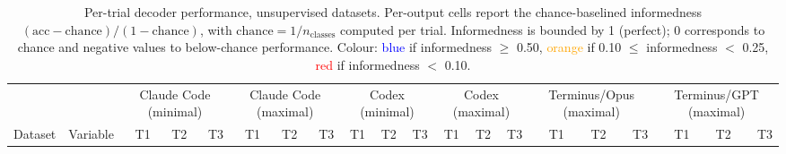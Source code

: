 \begin{table}[t]
\centering
\setlength{\tabcolsep}{4pt}
\begin{tabular}{l l rrr rrr rrr rrr rrr rrr}
\toprule
 & & \multicolumn{3}{c}{Claude Code (minimal)} & \multicolumn{3}{c}{Claude Code (maximal)} & \multicolumn{3}{c}{Codex (minimal)} & \multicolumn{3}{c}{Codex (maximal)} & \multicolumn{3}{c}{Terminus/Opus (maximal)} & \multicolumn{3}{c}{Terminus/GPT (maximal)} \\
\cmidrule(lr){3-5} \cmidrule(lr){6-8} \cmidrule(lr){9-11} \cmidrule(lr){12-14} \cmidrule(lr){15-17} \cmidrule(lr){18-20}
Dataset & Variable & T1 & T2 & T3 & T1 & T2 & T3 & T1 & T2 & T3 & T1 & T2 & T3 & T1 & T2 & T3 & T1 & T2 & T3 \\
\midrule
\bottomrule
\end{tabular}
\caption{Per-trial decoder performance, unsupervised datasets. Per-output cells report the chance-baselined informedness $(\mathrm{acc}-\mathrm{chance})/(1-\mathrm{chance})$, with $\mathrm{chance}=1/n_\mathrm{classes}$ computed per trial. Informedness is bounded by 1 (perfect); 0 corresponds to chance and negative values to below-chance performance. Colour: \textcolor{blue}{blue} if informedness $\geq$ 0.50, \textcolor{orange}{orange} if 0.10 $\leq$ informedness $<$ 0.25, \textcolor{red}{red} if informedness $<$ 0.10.}
\label{tab:decoder-unsupervised}
\end{table}
